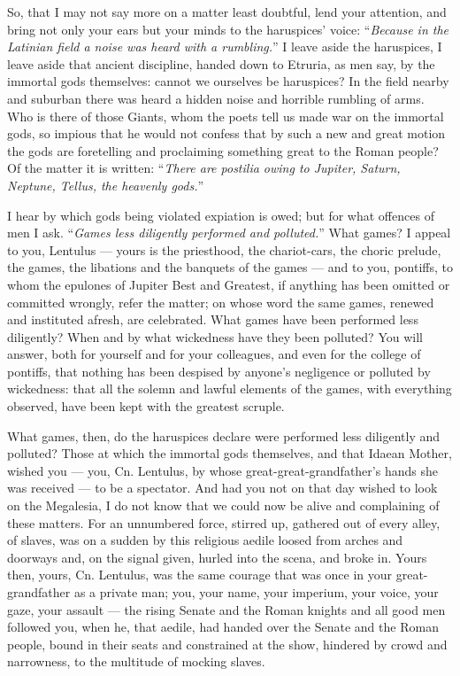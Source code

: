  So, that I may not say more on a matter least doubtful, lend your attention, and bring not only your ears but your minds to the haruspices' voice: ``\textit{Because in the Latinian field a noise was heard with a rumbling.}'' I leave aside the haruspices, I leave aside that ancient discipline, handed down to Etruria, as men say, by the immortal gods themselves: cannot we ourselves be haruspices? In the field nearby and suburban there was heard a hidden noise and horrible rumbling of arms. Who is there of those Giants, whom the poets tell us made war on the immortal gods, so impious that he would not confess that by such a new and great motion the gods are foretelling and proclaiming something great to the Roman people? Of the matter it is written: ``\textit{There are postilia owing to Jupiter, Saturn, Neptune, Tellus, the heavenly gods.}''

 I hear by which gods being violated expiation is owed; but for what offences of men I ask. ``\textit{Games less diligently performed and polluted.}'' What games? I appeal to you, Lentulus --- yours is the priesthood, the chariot-cars, the choric prelude, the games, the libations and the banquets of the games --- and to you, pontiffs, to whom the epulones of Jupiter Best and Greatest, if anything has been omitted or committed wrongly, refer the matter; on whose word the same games, renewed and instituted afresh, are celebrated. What games have been performed less diligently? When and by what wickedness have they been polluted? You will answer, both for yourself and for your colleagues, and even for the college of pontiffs, that nothing has been despised by anyone's negligence or polluted by wickedness: that all the solemn and lawful elements of the games, with everything observed, have been kept with the greatest scruple.

 What games, then, do the haruspices declare were performed less diligently and polluted? Those at which the immortal gods themselves, and that Idaean Mother, wished you --- you, Cn. Lentulus, by whose great-great-grandfather's hands she was received --- to be a spectator. And had you not on that day wished to look on the Megalesia, I do not know that we could now be alive and complaining of these matters. For an unnumbered force, stirred up, gathered out of every alley, of slaves, was on a sudden by this religious aedile loosed from arches and doorways and, on the signal given, hurled into the scena, and broke in. Yours then, yours, Cn. Lentulus, was the same courage that was once in your great-grandfather as a private man; you, your name, your imperium, your voice, your gaze, your assault --- the rising Senate and the Roman knights and all good men followed you, when he, that aedile, had handed over the Senate and the Roman people, bound in their seats and constrained at the show, hindered by crowd and narrowness, to the multitude of mocking slaves.

